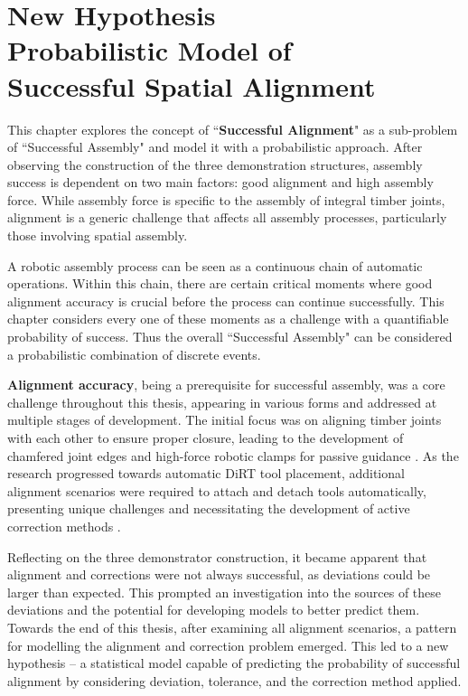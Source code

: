 \chapter[New Hypothesis - Probabilistic Model of Successful Spatial Alignment]{New Hypothesis\\Probabilistic Model of\\Successful Spatial Alignment}
\label{chapter:new-hypothesis}

This chapter explores the concept of ``\textbf{Successful Alignment}" as a sub-problem of ``Successful Assembly" and model it with a probabilistic approach. After observing the construction of the three demonstration structures, assembly success is dependent on two main factors: good alignment and high assembly force. While assembly force is specific to the assembly of integral timber joints, alignment is a generic challenge that affects all assembly processes, particularly those involving spatial assembly.

A robotic assembly process can be seen as a continuous chain of automatic operations. Within this chain, there are certain critical moments where good alignment accuracy is crucial before the process can continue successfully. This chapter considers every one of these moments as a challenge with a quantifiable probability of success. Thus the overall ``Successful Assembly" can be considered a probabilistic combination of discrete events.

\textbf{Alignment accuracy}, being a prerequisite for successful assembly, was a core challenge throughout this thesis, appearing in various forms and addressed at multiple stages of development. The initial focus was on aligning timber joints with each other to ensure proper closure, leading to the development of chamfered joint edges and high-force robotic clamps for passive guidance . As the research progressed towards automatic DiRT tool placement, additional alignment scenarios were required to attach and detach tools automatically, presenting unique challenges and necessitating the development of active correction methods .

Reflecting on the three demonstrator construction, it became apparent that alignment and corrections were not always successful, as deviations could be larger than expected. This prompted an investigation into the sources of these deviations and the potential for developing models to better predict them. Towards the end of this thesis, after examining all alignment scenarios, a pattern for modelling the alignment and correction problem emerged. This led to a new hypothesis -- a statistical model capable of predicting the probability of successful alignment by considering deviation, tolerance, and the correction method applied.

